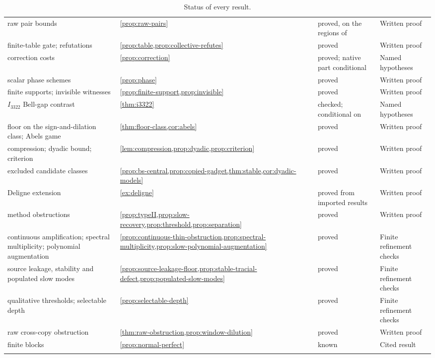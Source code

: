 \begin{longtable}{@{}L{0.3\textwidth}L{0.2\textwidth}L{0.18\textwidth}L{0.22\textwidth}@{}}
raw pair bounds & \cref{prop:raw-pairs} & proved, on the regions of~\cite[\S6]{DM-H3} & Written proof\\
finite-table gate; refutations & \cref{prop:table,prop:collective-refutes} & proved & Written proof\\
correction costs & \cref{prop:correction} & proved; native part conditional & Named hypotheses\\
scalar phase schemes & \cref{prop:phase} & proved & Written proof\\
finite supports; invisible witnesses & \cref{prop:finite-support,prop:invisible} & proved & Written proof\\
$I_{3322}$ Bell-gap contrast & \cref{thm:i3322} & checked; conditional on~\cite{Dou26} & Named hypotheses\\
floor on the sign-and-dilation class; Abels game & \cref{thm:floor-class,cor:abels} & proved & Written proof\\
compression; dyadic bound; criterion & \cref{lem:compression,prop:dyadic,prop:criterion} & proved & Written proof\\
excluded candidate classes & \cref{prop:bs-central,prop:copied-gadget,thm:stable,cor:dyadic-models} & proved & Written proof\\
Deligne extension & \cref{ex:deligne} & proved from imported results~\cite{Del78,BLSW23,DGLT20} & Written proof\\
method obstructions & \cref{prop:typeII,prop:slow-recovery,prop:threshold,prop:separation} & proved & Written proof\\
continuous amplification; spectral multiplicity; polynomial augmentation & \cref{prop:continuous-thin-obstruction,prop:spectral-multiplicity,prop:slow-polynomial-augmentation} & proved & Finite refinement checks\\
source leakage, stability and populated slow modes & \cref{prop:source-leakage-floor,prop:stable-tracial-defect,prop:populated-slow-modes} & proved & Finite refinement checks\\
qualitative thresholds; selectable depth & \cref{prop:selectable-depth} & proved & Finite refinement checks\\
raw cross-copy obstruction & \cref{thm:raw-obstruction,prop:window-dilution} & proved & Written proof\\
finite blocks & \cref{prop:normal-perfect} & known~\cite{KPS18} & Cited result\\
\bottomrule
\caption{Status of every result.}\label{tab:status}
\end{longtable}
